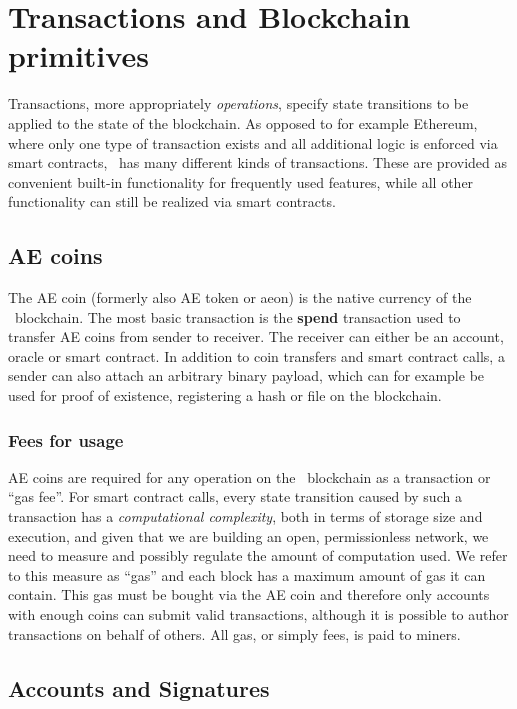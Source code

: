 \section{Transactions and Blockchain primitives}
\label{sect:transactions}

Transactions, more appropriately \textit{operations}, specify state transitions
to
be applied to the state of the blockchain. As opposed to for example Ethereum,
where only one type of transaction exists and all additional logic is enforced
via smart contracts, \aet\ has many different kinds of transactions.
These are provided as convenient built-in functionality for frequently used
features, while all other functionality can still be realized via smart
contracts.



\subsection{AE coins}
\label{sect:aespend}

The AE coin (formerly also AE token or aeon) is the native currency of the
\aet\ blockchain. The most basic transaction is the \textbf{spend} transaction
used to
transfer AE coins from sender to receiver. The receiver can either be an
account,
oracle or smart contract. 
In addition to coin transfers and smart contract calls, a sender can also
attach an arbitrary binary
payload, which can for example be used for proof of existence, registering a
hash or file on the blockchain.

\subsubsection{Fees for usage}
AE coins are required for any operation on the \aet\ blockchain as a
transaction or \enquote{gas fee}. For smart contract calls, every state
transition
caused
by such a transaction has a \textit{computational
complexity}, both in terms of storage size and execution, and given that we are
building an open, permissionless network, we need to measure and possibly
regulate the amount of computation used. We refer to this measure as
\enquote{gas}
and
each block has a maximum amount of gas it can contain.
This gas must be bought via the AE coin and therefore only
accounts with enough coins can submit valid transactions, although it is
possible to author transactions on behalf of others. All gas, or simply fees,
is paid to miners.


\subsection{Accounts and Signatures}
\label{sect:ga}

